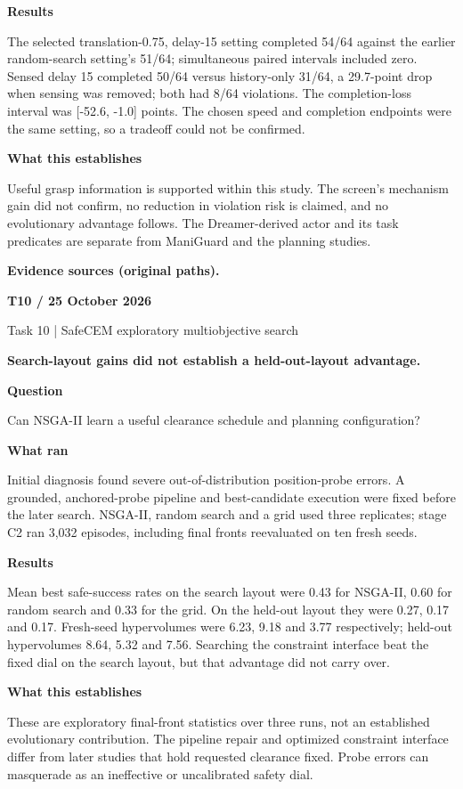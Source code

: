 \documentclass[11pt,a4paper]{article}
\newcommand{\block}[2]{\par\textbf{\color{ink}#1}\par\nopagebreak #2\par}
\newcommand{\finding}[1]{\begin{tcolorbox}[colback=pale,colframe=pale,boxrule=0pt,arc=1mm,left=10pt,right=10pt,top=10pt,bottom=10pt]\color{ink}\large\bfseries #1\end{tcolorbox}}
\begin{document}
\block{Results}{The selected translation-0.75, delay-15 setting completed 54/64 against the earlier random-search setting's 51/64; simultaneous paired intervals included zero. Sensed delay 15 completed 50/64 versus history-only 31/64, a 29.7-point drop when sensing was removed; both had 8/64 violations. The completion-loss interval was [-52.6, -1.0] points. The chosen speed and completion endpoints were the same setting, so a tradeoff could not be confirmed.}
\block{What this establishes}{Useful grasp information is supported within this study. The screen's mechanism gain did not confirm, no reduction in violation risk is claimed, and no evolutionary advantage follows. The Dreamer-derived actor and its task predicates are separate from ManiGuard and the planning studies.}
\vfill{\footnotesize\color{muted}\textbf{Evidence sources (original paths).}\par
\raggedright {}\par {}}
\clearpage
{}\label{exp:T10}
{\color{accent}\small\bfseries T10 / 25 October 2026}\par
{}\par
{\color{muted}\small Task 10 | SafeCEM exploratory multiobjective search}\par\vspace{2mm}
\finding{Search-layout gains did not establish a held-out-layout advantage.}
\block{Question}{Can NSGA-II learn a useful clearance schedule and planning configuration?}
\block{What ran}{Initial diagnosis found severe out-of-distribution position-probe errors. A grounded, anchored-probe pipeline and best-candidate execution were fixed before the later search. NSGA-II, random search and a grid used three replicates; stage C2 ran 3,032 episodes, including final fronts reevaluated on ten fresh seeds.}
\block{Results}{Mean best safe-success rates on the search layout were 0.43 for NSGA-II, 0.60 for random search and 0.33 for the grid. On the held-out layout they were 0.27, 0.17 and 0.17. Fresh-seed hypervolumes were 6.23, 9.18 and 3.77 respectively; held-out hypervolumes 8.64, 5.32 and 7.56. Searching the constraint interface beat the fixed dial on the search layout, but that advantage did not carry over.}
\block{What this establishes}{These are exploratory final-front statistics over three runs, not an established evolutionary contribution. The pipeline repair and optimized constraint interface differ from later studies that hold requested clearance fixed. Probe errors can masquerade as an ineffective or uncalibrated safety dial.}
\end{document}
